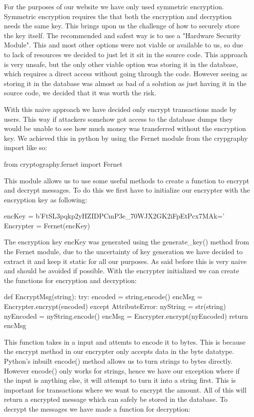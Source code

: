For the purposes of our website we have only used symmetric encryption. Symmetric encryption requires the that both the encryption and decryption needs the same key. This brings upon us the challenge of how to securely store the key itself. The recommended and safest way is to use a "Hardware Security Module". This and most other options were not viable or available to us, so due to lack of resources we decided to just let it sit in the source code. This approach is very unsafe, but the only other viable option was storing it in the database, which requires a direct access without going through the code. However seeing as storing it in the database was almost as bad of a solution as just having it in the source code, we decided that it was worth the risk. 

With this naive approach we have decided only encrypt transactions made by users. This way if attackers somehow got access to the database dumps they would be unable to see how much money was transferred without the encryption key. We achieved this in python by using the Fernet module from the crypgraphy import like so:
\begin{python}[language=Python]
from cryptography.fernet import Fernet
\end{python}

This module allows us to use some useful methods to create a function to encrypt and decrypt messages. To do this we first have to initialize our encrypter with the encryption key as following:
\begin{python}
encKey = b'FtSL3pqkp2yHZIDPCmP3e_70WJX2GK2iFpEtPcx7MAk='
Encrypter = Fernet(encKey)
\end{python}

The encryption key encKey was generated using the generate\_key() method from the Fernet module, due to the uncertainty of key generation we have decided to extract it and keep it static for all our purposes. As said before this is very naive and should be avoided if possible. With the encrypter initialized we can create the functions for encryption and decryption:
\begin{python}
def EncryptMsg(string):
try:
    encoded = string.encode()
    encMsg = Encrypter.encrypt(encoded)
except AttributeError:
    nyString = str(string)
    nyEncoded = nyString.encode()
    encMsg = Encrypter.encrypt(nyEncoded)
return encMsg
\end{python}

This function takes in a input and attemts to encode it to bytes. This is because the encrypt method in our encrypter only accepts data in the byte datatype. Python's inbuilt encode() method allows us to turn strings to bytes directly. However encode() only works for strings, hence we have our exception where if the input is anything else, it will attempt to turn it into a string first. This is important for transactions where we want to encrypt the amount. All of this will return a encrypted message which can safely be stored in the database. To decrypt the messages we have made a function for decryption:

